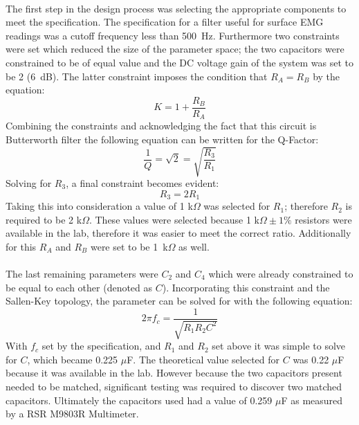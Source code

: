 \documentclass[justified]{tufte-handout}
\begin{document}
\paragraph{} The first step in the design process was selecting the appropriate
components to meet the specification. The specification for a filter useful for
surface EMG readings was a cutoff frequency less than 500~Hz. Furthermore two
constraints were set which reduced the size of the parameter space; the two
capacitors were constrained to be of equal value and the DC voltage gain of the
system was set to be 2 (6~dB). The latter constraint imposes the condition that
$R_A = R_B$ by the equation:
\begin{equation}
K = 1 + \frac{R_B}{R_A}
\end{equation}
Combining the constraints and acknowledging the fact that this circuit is
Butterworth filter the following equation can be written for the Q-Factor:
\begin{equation}
\frac{1}{Q} = \sqrt{2} = \sqrt{\frac{R_3}{R_1}}
\end{equation}
Solving for $R_3$, a final constraint becomes evident:
\begin{equation}
R_3 = 2R_1
\end{equation}
Taking this into consideration a value of 1 k$\Omega$ was selected for $R_1$;
therefore $R_2$ is required to be 2 k$\Omega$. These values were selected
because 1 k$\Omega \pm 1\%$ resistors were available in the lab, therefore it
was easier to meet the correct ratio. Additionally for this $R_A$ and $R_B$ were
set to be 1~k$\Omega$ as well.
\paragraph{} The last remaining parameters were $C_2$ and $C_4$ which were
already constrained to be equal to each other (denoted as $C$). Incorporating
this constraint and the Sallen-Key topology, the parameter can be solved for
with the following equation:
\begin{equation}
2\pi f_c = \frac{1}{\sqrt{R_1R_2C^2}}
\end{equation}
With $f_c$ set by the specification, and $R_1$ and $R_2$ set above it was simple
to solve for $C$, which became 0.225 $\mu$F. The theoretical value selected
for $C$ was 0.22 $\mu$F because it was available in the lab. However because the
two capacitors present needed to be matched, significant testing was required to
discover two matched capacitors. Ultimately the capacitors used had a value of
0.259 $\mu$F as measured by a RSR M9803R Multimeter. 
\end{document}
